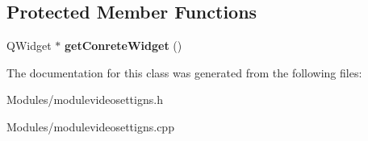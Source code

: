 \subsection*{Protected Member Functions}
\begin{DoxyCompactItemize}
\item 
\hypertarget{class_module_video_settigns_a55099668567fede6f150aa977673c306}{
QWidget $\ast$ {\bfseries getConreteWidget} ()}
\label{d6/d30/class_module_video_settigns_a55099668567fede6f150aa977673c306}

\end{DoxyCompactItemize}


The documentation for this class was generated from the following files:\begin{DoxyCompactItemize}
\item 
Modules/modulevideosettigns.h\item 
Modules/modulevideosettigns.cpp\end{DoxyCompactItemize}
